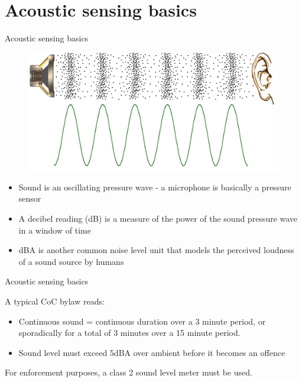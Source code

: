 \documentclass{beamer}
\begin{document}
\section{Acoustic sensing basics}

    \begin{frame}{Acoustic sensing basics}
        
        \begin{center}
            \begin{figure}
                \includegraphics[scale=0.25]{figures/sound_pressure_wave.png}
            \end{figure}
        \end{center}
        
        \begin{itemize}
            \item Sound is an oscillating pressure wave - a microphone is basically a pressure sensor
            \item A decibel reading (dB) is a measure of the power of the sound pressure wave in a window of time
            \item dBA is another common noise level unit that models the perceived loudness of a sound source by humans 
        \end{itemize} 
        
    \end{frame}
    
    \begin{frame}{Acoustic sensing basics}
        
        A typical CoC bylaw reads:
        \begin{center} 
        \end{center}
        \begin{itemize}
            \item Continuous sound = continuous duration over a 3 minute period, or sporadically for a total of 3 minutes over a 15 minute period. 
            \item Sound level must exceed 5dBA over ambient before it becomes an offence
        \end{itemize}
        For enforcement purposes, a class 2 sound level meter must be used.
        
    \end{frame}
\end{document}
